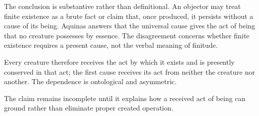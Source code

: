 The conclusion is substantive rather than definitional. An objector may treat finite existence as a brute fact or claim that, once produced, it persists without a cause of its being. Aquinas answers that the universal cause gives the act of being that no creature possesses by essence. The disagreement concerns whether finite existence requires a present cause, not the verbal meaning of finitude.

Every creature therefore receives the act by which it exists and is presently conserved in that act; the first cause receives its act from neither the creature nor another. The dependence is ontological and asymmetric.

The claim remains incomplete until it explains how a received act of being can ground rather than eliminate proper created operation.
